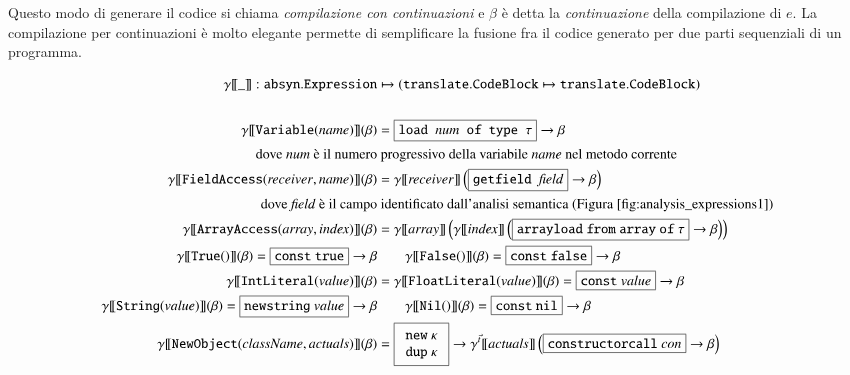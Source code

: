 Questo modo di generare il codice
si chiama \emph{compilazione con continuazioni} e $\beta$ \`e detta
la \emph{continuazione} della compilazione di $e$. La compilazione per
continuazioni \`e molto elegante \poiche permette di semplificare la fusione
fra il codice generato per due parti sequenziali di un programma.
%
\begin{figure}[t]
{\scriptsize
\begin{align*}
  \gen{\_}:\mathtt{absyn.Expression}&\mapsto(\mathtt{translate.CodeBlock}\mapsto\mathtt{translate.CodeBlock})\\
  \mbox{}\\
  \gen{\mathtt{Variable(\mathit{name})}}(\beta)&=\fbox{\texttt{load $\mathit{num}$ of type $\tau$}}\to\beta\\
  \text{dove $\mathit{num}$ \`e il numero}&\text{ progressivo della variabile \textit{name} nel metodo corrente}\\
  \gen{\mathtt{FieldAccess(\mathit{receiver},\mathit{name})}}(\beta)&=
    \gen{\mathit{receiver}}\left(\fbox{\texttt{getfield $\mathit{field}$}}
    \to\beta\right)\\
  \text{dove $\mathit{field}$ \`e il campo}&\text{ identificato
    dall'analisi semantica (Figura~\ref{fig:analysis_expressions1})}\\
  \gen{\mathtt{ArrayAccess(\mathit{array},\mathit{index})}}(\beta)&=
    \gen{\mathit{array}}\left(\gen{\mathit{index}}\left(
    \fbox{$\mathtt{arrayload\ from\ array\ of\ }\tau$}\to\beta\right)\right)\\
  \gen{\mathtt{True()}}(\beta)=\fbox{$\mathtt{const\ true}$}\to\beta&\qquad
  \gen{\mathtt{False()}}(\beta)=\fbox{$\mathtt{const\ false}$}\to\beta\\
  \gen{\mathtt{IntLiteral(\mathit{value})}}(\beta)
    &=\gen{\mathtt{FloatLiteral(\mathit{value})}}(\beta)
    =\fbox{$\mathtt{const}\ \mathit{value}$}\to\beta\\
  \gen{\mathtt{String(\mathit{value})}}(\beta)
    =\fbox{$\mathtt{newstring}\ \mathit{value}$}\to\beta&\qquad
    \gen{\mathtt{Nil()}}(\beta)=\fbox{$\mathtt{const\ nil}$}\to\beta\\
  \gen{\mathtt{NewObject(\mathit{className},\mathit{actuals})}}(\beta)
    &=\fbox{$\begin{array}{l}
      \mathtt{new}\ \kappa\\
      \mathtt{dup}\ \kappa
    \end{array}$}\to
   \gentwo{\vec{t}}{\mathit{actuals}}
   \left(\fbox{$\mathtt{constructorcall}\ \mathit{con}$}\to\beta\right)\\

\end{align*}}
\end{figure}
